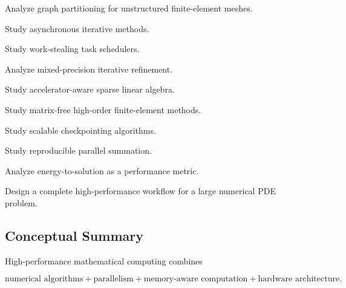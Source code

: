 \begin{exercise}[4]
Analyze graph partitioning for unstructured finite-element meshes.
\end{exercise}

\begin{exercise}[4]
Study asynchronous iterative methods.
\end{exercise}

\begin{exercise}[4]
Study work-stealing task schedulers.
\end{exercise}

\begin{exercise}[4]
Analyze mixed-precision iterative refinement.
\end{exercise}

\begin{exercise}[4]
Study accelerator-aware sparse linear algebra.
\end{exercise}

\begin{exercise}[4]
Study matrix-free high-order finite-element methods.
\end{exercise}

\begin{exercise}[4]
Study scalable checkpointing algorithms.
\end{exercise}

\begin{exercise}[4]
Study reproducible parallel summation.
\end{exercise}

\begin{exercise}[4]
Analyze energy-to-solution as a performance metric.
\end{exercise}

\begin{exercise}[4]
Design a complete high-performance workflow for a large numerical PDE
problem.
\end{exercise}

\subsection{Conceptual Summary}
\label{subsec:hpmc-summary}

High-performance mathematical computing combines

\[
\boxed{
\text{numerical algorithms}
+
\text{parallelism}
+
\text{memory-aware computation}
+
\text{hardware architecture}.
}
\]


